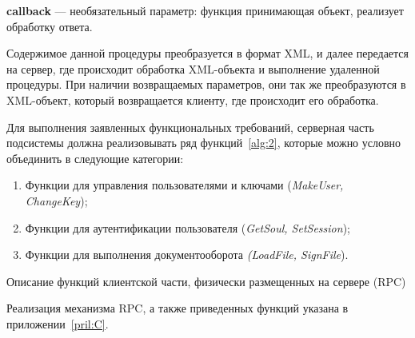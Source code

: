 \textbf{callback} --- необязательный параметр: функция принимающая объект,
реализует обработку ответа.

Содержимое данной процедуры преобразуется в формат XML, и далее передается на
сервер, где происходит обработка XML-объекта и выполнение удаленной процедуры.
При наличии возвращаемых параметров, они так же преобразуются в XML-объект,
который возвращается клиенту, где происходит его обработка.

Для выполнения заявленных функциональных требований, серверная часть подсистемы
должна реализовывать ряд функций~\ref{alg:2}, которые можно условно объединить в
следующие категории:
\begin{enumerate}
  \item Функции для управления пользователями и ключами (\textit{MakeUser,
  \\ ChangeKey});
  \item Функции для аутентификации пользователя (\textit{GetSoul, SetSession});
  \item Функции для выполнения документооборота \textit{(LoadFile, SignFile}).
\end{enumerate}

\begin{algorithm}[ht]
\caption{Описание функций клиентской части, физически размещенных на сервере
(RPC)}
\label{alg:2}     
\small                    
\begin{algorithmic}

 

 
\EndProcedure

 

 
\EndProcedure

 

 
\EndProcedure
  
  

 
\EndProcedure

  
\EndProcedure

  
\EndProcedure

\end{algorithmic}
\end{algorithm}

Реализация механизма RPC, а также приведенных функций указана в
приложении~\ref{pril:C}.